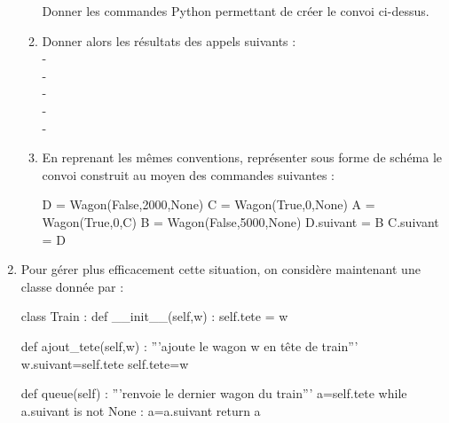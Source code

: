 \documentclass[11pt,a4paper,french,twoside]{PMCours}
\begin{document}
\begin{enumerate}
\begin{enumerate}
Donner les commandes Python permettant de créer le convoi ci-dessus.
\item Donner alors les résultats des appels suivants : \\
- \\
- \\
- \\
- \\
- 
\item En reprenant les mêmes conventions, représenter sous forme de schéma le convoi construit au moyen des commandes suivantes :
\begin{Python}
D = Wagon(False,2000,None)
C = Wagon(True,0,None)
A = Wagon(True,0,C)
B = Wagon(False,5000,None)
D.suivant = B
C.suivant = D
\end{Python}
\end{enumerate}
\item Pour gérer plus efficacement cette situation, on considère maintenant une classe  donnée par : 
\begin{Python}
class Train : 
	def __init__(self,w) : 
		self.tete = w
		
	def ajout_tete(self,w) : 
		'''ajoute le wagon w en tête de train'''
		w.suivant=self.tete
		self.tete=w
		
	def queue(self) : 
		'''renvoie le dernier wagon du train'''
		a=self.tete
		while a.suivant is not None :
			a=a.suivant
		return a
\end{Python}	 	 



\end{enumerate}
\end{document}
